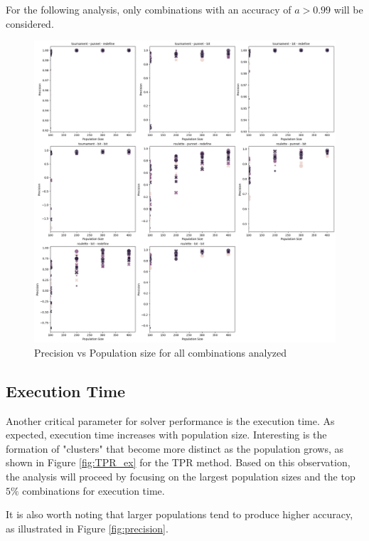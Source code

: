 \documentclass[11pt,a4paper,twoside]{article}
\begin{document}
For the following analysis, only combinations with an accuracy of $a > 0.99$ will be considered.
\begin{figure}[H]
    \centering
    \includegraphics[width=\textwidth]{overall.png}
    \caption{Precision vs Population size for all combinations analyzed}
    \label{fig:overall}
\end{figure}

\subsection{Execution Time}

Another critical parameter for solver performance is the execution time. As expected, execution time increases with population size. Interesting is the formation of "clusters" that become more distinct as the population grows, as shown in Figure \ref{fig:TPR_ex} for the TPR method. Based on this observation, the analysis will proceed by focusing on the largest population sizes and the top $5\%$ combinations for execution time.

It is also worth noting that larger populations tend to produce higher accuracy, as illustrated in Figure \ref{fig:precision}.
\end{document}
